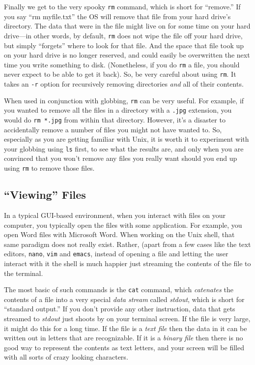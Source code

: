 \documentclass[]{krantz}
\begin{document}
Finally we get to the very spooky \texttt{rm} command, which is short for ``remove.'' If you
say ``rm myfile.txt'' the OS will remove that file from your hard drive's directory. The data
that were in the file might live on for some time on your hard drive---in other words, by default,
\texttt{rm} does not wipe the file off your hard drive, but simply ``forgets'' where to look for that file. And
the space that file took up on your hard drive is no longer reserved, and could easily be
overwritten the next time you write something to disk. (Nonetheless, if you do \texttt{rm} a file, you should never expect to be able to get it back). So, be very careful about using \texttt{rm}. It takes an \texttt{-r} option for recursively removing directories \emph{and} all of
their contents.

When used in conjunction with globbing, \texttt{rm} can be very useful. For example, if you wanted
to remove all the files in a directory with a \texttt{.jpg} extension, you would do \texttt{rm\ *.jpg} from
within that directory. However, it's a disaster to accidentally remove a number of files you
might not have wanted to. So, especially as you are getting familiar with Unix, it is
worth it to experiment with your globbing using \texttt{ls} first, to see what the results are,
and only when you are convinced that you won't remove any files you really want should you
end up using \texttt{rm} to remove those files.

\hypertarget{viewing-files}{%
\subsection{``Viewing'' Files}\label{viewing-files}}

In a typical GUI-based environment, when you interact with files on your computer,
you typically open the files with some application. For example, you open Word files
with Microsoft Word. When working on the Unix shell, that same paradigm does not
really exist. Rather, (apart from a few cases like the text editors, \texttt{nano}, \texttt{vim} and
\texttt{emacs}, instead of opening a file and letting the user interact with it the shell is
much happier just streaming the contents of the file to the terminal.

The most basic of such commands is the \texttt{cat} command, which \emph{catenates} the contents
of a file into a very special \emph{data stream} called \emph{stdout}, which is short
for ``standard output.'' If you don't provide any other instruction, data that gets
streamed to \emph{stdout} just shoots by on your terminal screen. If the file is very large, it might
do this for a long time. If the file is a \emph{text file} then the data in it can be
written out in letters that are recognizable. If it is a \emph{binary file} then there is
no good way to represent the contents as text letters, and your screen will be filled with
all sorts of crazy looking characters.
\end{document}

